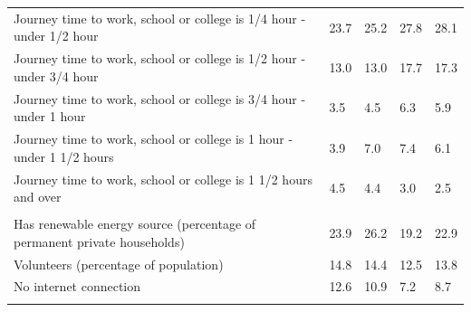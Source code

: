 \documentclass{article}
\begin{document}
\begin{table}[h]
\begin{tabular}{KTTTT}
Journey time to work, school or college is 1/4 hour - under 1/2 hour & 23.7& 25.2& 27.8& 28.1\\
Journey time to work, school or college is 1/2 hour - under 3/4 hour & 13.0& 13.0& 17.7& 17.3\\
Journey time to work, school or college is 3/4 hour - under 1 hour & 3.5& 4.5& 6.3& 5.9\\
Journey time to work, school or college is 1 hour - under 1 1/2 hours & 3.9& 7.0& 7.4& 6.1\\
Journey time to work, school or college is 1 1/2 hours and over & 4.5& 4.4& 3.0& 2.5\\
\hline
    \\ 
    \hline
Has renewable energy source (percentage of permanent private households) & 23.9& 26.2& 19.2& 22.9\\
    \hline
Volunteers (percentage of population) & 14.8& 14.4& 12.5& 13.8\\
    \hline
No internet connection& 12.6& 10.9&  7.2&  8.7\\
\hline
\end{tabular}
\end{table}
\end{document}
